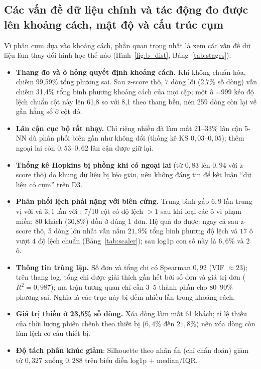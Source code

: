 \subsection{Các vấn đề dữ liệu chính và tác động đo được lên khoảng cách, mật độ và cấu trúc cụm}
Vì phân cụm dựa vào khoảng cách, phần quan trọng nhất là xem các vấn đề dữ liệu làm thay đổi hình học thế nào (Hình~\ref{fig:b_dist}, Bảng~\ref{tab:stages}):
\begin{itemize}
\item \textbf{Thang đo và ô hỏng quyết định khoảng cách.} Khi không chuẩn hóa,  chiếm 99,59\% tổng phương sai. Sau z-score thô, 7 dòng lỗi (2,7\% số dòng) vẫn chiếm 31,4\% tổng bình phương khoảng cách của mọi cặp;
một ô =999 kéo độ lệch chuẩn cột này lên 61,8 so với 8,1 theo thang bền, nén 259 dòng còn lại về gần hằng số ở cột đó.
\item \textbf{Lân cận cục bộ rất nhạy.} Chỉ riêng nhiễu đã làm mất 21--33\% lân cận 5-NN dù phân phối biên gần như không đổi (thống kê KS $0{,}03$--$0{,}05$); thêm ngoại lai còn $0{,}53$--$0{,}62$ lân cận được giữ lại.
\item \textbf{Thống kê Hopkins bị phồng khi có ngoại lai} (từ $0{,}83$ lên $0{,}94$ với z-score thô) do khung dữ liệu bị kéo giãn, nên không đáng tin để kết luận ``dữ liệu có cụm'' trên D3.
\item \textbf{Phân phối lệch phải nặng với biên cứng.} Trung bình gấp $6{,}9$ lần trung vị với  và $3{,}1$ lần với ; 7/10 cột có độ lệch $>1$ sau khi loại các ô vi phạm miền; 80 khách (30,8\%) dồn ở đúng 1 đơn.
Hệ quả đo được: ngay cả sau z-score thô, 5 dòng lớn nhất vẫn nắm $21{,}9\%$ tổng bình phương độ lệch và $17$ ô vượt $4$ độ lệch chuẩn (Bảng~\ref{tab:scaler}); sau log1p con số này là $6{,}6\%$ và $2$ ô.
\item \textbf{Thông tin trùng lặp.} Số đơn và tổng chi có Spearman $0{,}92$ (VIF $\approx 23$); trên thang log, tổng chi được giải thích gần hết bởi số đơn và giá trị đơn ($R^2 = 0{,}987$); ma trận tương quan chỉ cần 3--5 thành phần cho 80--90\% phương sai.
Nghĩa là các trục này bị đếm nhiều lần trong khoảng cách.
\item \textbf{Giá trị thiếu ở 23,5\% số dòng.} Xóa dòng làm mất 61 khách; tỉ lệ thiếu của thời lượng phiên chênh theo thiết bị ($6{,}4\%$ đến $21{,}8\%$) nên xóa dòng còn làm lệch cơ cấu thiết bị.
\item \textbf{Độ tách phân khúc giảm}: Silhouette theo nhãn ẩn (chỉ chẩn đoán) giảm từ $0{,}327$ xuống $0{,}288$ trên biểu diễn log1p + median/IQR.
\end{itemize}

